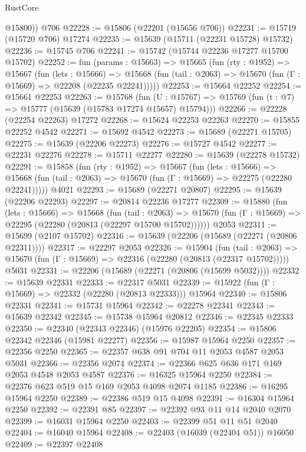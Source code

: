 \begin{lexlean}{RustCore}
\begin{coremodule}
        @15800))
    @706
@22228 := @15806 (@22201 (@15656 @706))
@22231 := @15719 (@15720 @706) @17274
@22235 := @15639 (@15711 (@22231 @15728) @15732)
@22236 := @15745 @706
@22241 := @15742 (@15744 @22236 @17277 @15700 @15702)
@22252 := fun (params : @15663) =>
  @15665
    (fun (rty : @1952) =>
    @15667
      (fun (lets : @15666) =>
      @15668 (fun (tail : @2063) => @15670 (fun (Γ : @15669) => @22208 (@22235 @22241)))))
@22253 := @15664 @22252
@22254 := @15661 @22253
@22263 := @15768
    (fun (U : @15767) => @15769 (fun (t : @7) => @15777 (@15639 (@15783 @17274 @15657) @15794)))
@22266 := @22228 (@22254 @22263) @17272
@22268 := @15624 @22253 @22263
@22270 := @15855 @22252 @4542
@22271 := @15692 @4542
@22273 := @15689 (@22271 @15705)
@22275 := @15639 (@22206 @22273)
@22276 := @15727 @4542
@22277 := @22231 @22276
@22278 := @15711 @22277
@22280 := @15639 (@22278 @15732)
@22291 := @15858
    (fun (rty : @1952) =>
    @15667
      (fun (lets : @15666) =>
      @15668 (fun (tail : @2063) => @15670 (fun (Γ : @15669) => @22275 (@22280 @22241)))))
    @4021
@22293 := @15689 (@22271 @20807)
@22295 := @15639 (@22206 @22293)
@22297 := @20814 @22236 @17277
@22309 := @15880
    (fun (lets : @15666) =>
    @15668
      (fun (tail : @2063) =>
      @15670 (fun (Γ : @15669) => @22295 (@22280 (@20813 (@22297 @15700 @15702))))))
    @2053
@22311 := @15699 (@2107 @15702)
@22316 := @15639 (@22206 (@15689 (@22271 (@20806 @22311))))
@22317 := @22297 @2053
@22326 := @15904
    (fun (tail : @2063) => @15670 (fun (Γ : @15669) => @22316 (@22280 (@20813 (@22317 @15702)))))
    @5031
@22331 := @22206 (@15689 (@22271 (@20806 (@15699 @5032))))
@22332 := @15639 @22331
@22333 := @22317 @5031
@22339 := @15922 (fun (Γ : @15669) => @22332 (@22280 (@20813 @22333))) @15964
@22340 := @15806 @22331
@22341 := @15731 @15964
@22342 := @22278 @22341
@22343 := @15639 @22342
@22345 := @15738 @15964 @20812
@22346 := @22345 @22333
@22350 := @22340 (@22343 @22346) (@15976 @22205)
@22354 := @15806 @22342 @22346 (@15981 @22277)
@22356 := @15987 @15964 @2250
@22357 := @22356 @2250
@22365 := @22357 @638 @91 @704 @11 @2053 @4587 @2053 @5031
@22366 := @22356 @2074
@22374 := @22366 @625 @636 @171 @169 @2053 @4548 @2053 @4587
@22376 := @16325 @15964 @2250
@22384 := @22376 @623 @519 @15 @169 @2053 @4098 @2074 @1185
@22386 := @16295 @15964 @2250
@22389 := @22386 @519 @15 @4098
@22391 := @16304 @15964 @2250
@22392 := @22391 @85
@22397 := @22392 @93 @11 @14 @2040 @2070
@22399 := @16031 @15964 @2250
@22403 := @22399 @51 @11 @51 @2040
@22404 := @16040 @15964
@22408 := @22403 (@16039 (@22404 @51)) @16050
@22409 := @22397 @22408

\end{coremodule}
\end{lexlean}
